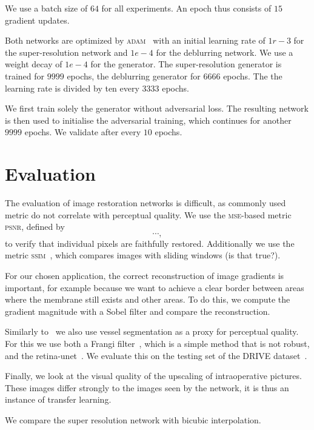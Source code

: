 \documentclass{scrartcl}
\begin{document}
We use a batch size of $64$ for all experiments.
An epoch thus consists of $15$ gradient updates.

Both networks are optimized by \textsc{adam}~\cite{Adam} with an initial learning rate of $1r-3$ for the super-resolution network and $1e-4$ for the deblurring network.
We use a weight decay of $1e-4$ for the generator.
The super-resolution generator is trained for $9999$ epochs, the deblurring generator for $6666$ epochs.
The the learning rate is divided by ten every $3333$ epochs.

We first train solely the generator without adversarial loss.
The resulting network is then used to initialise the adversarial training, which continues for another $9999$ epochs.
We validate after every $10$ epochs.

\section{Evaluation}
The evaluation of image restoration networks is difficult, as commonly used metric do not correlate with perceptual quality.
We use the \textsc{mse}-based metric \textsc{psnr}, defined by
\begin{equation}
  \label{eq:psnr}
  \cdots,
\end{equation}
to verify that individual pixels are faithfully restored.
Additionally we use the metric \textsc{ssim}~\cite{Ssim}, which compares images with sliding windows (is that true?).

For our chosen application, the correct reconstruction of image gradients is important, for example because we want to achieve a clear border between areas where the membrane still exists and other areas.
To do this, we compute the gradient magnitude with a Sobel filter and compare the reconstruction.

Similarly to~\cite{SaliencyGAN} we also use vessel segmentation as a proxy for perceptual quality.
For this we use both a Frangi filter~\cite{Frangi}, which is a simple method that is not robust, and the retina-unet~\cite{RetinaUnet}.
We evaluate this on the testing set of the DRIVE dataset~\cite{Drive}.

Finally, we look at the visual quality of the upscaling of intraoperative pictures.
These images differ strongly to the images seen by the network, it is thus an instance of transfer learning.

We compare the super resolution network with bicubic interpolation.
\end{document}

